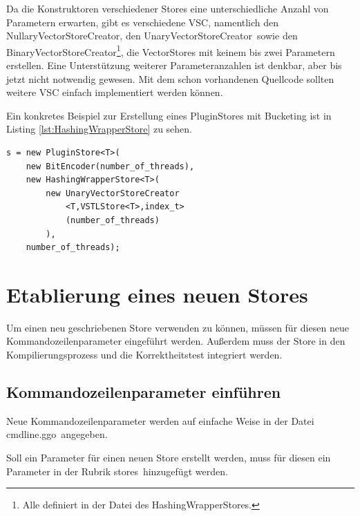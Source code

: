 \documentclass[12pt,a4paper,titlepage]{scrartcl}
\renewcommand \( {\left (}
\renewcommand \) {\right )}
\renewcommand \[ {\left [}
\renewcommand \] {\right ]}
\newcommand \Flqq {\flqq\ }
\begin{document}
Da die Konstruktoren verschiedener Stores eine unterschiedliche Anzahl von Parametern erwarten, gibt es verschiedene VSC, namentlich den \frqq NullaryVectorStoreCreator\frqq, den \frqq UnaryVectorStoreCreator\Flqq sowie den \frqq BinaryVectorStoreCreator\flqq\footnote{Alle definiert in der Datei des HashingWrapperStores.}, die VectorStores mit keinem bis zwei Parametern erstellen. Eine Unterstützung weiterer Parameteranzahlen ist denkbar, aber bis jetzt nicht notwendig gewesen. Mit dem schon vorhandenen Quellcode sollten weitere VSC einfach implementiert werden können.

Ein konkretes Beispiel zur Erstellung eines PluginStores mit Bucketing ist in Listing \ref{lst:HashingWrapperStore} zu sehen.

\begin{center}
\begin{minipage}{0.7\textwidth}
\lstset{language=C++}
\begin{lstlisting}[label=lst:HashingWrapperStore,caption={Erstellung eines PluginStores mit Bucketing. Dem HashingWrapperStore wird ein UnaryVectorStoreCreator übergeben, welcher einen VSTLStore erstellt. Das Argument des VSC-Konstruktors wird an jeden erstellten VSTL-Store weitergereicht.}]
s = new PluginStore<T>(
	new BitEncoder(number_of_threads),
	new HashingWrapperStore<T>(
		new UnaryVectorStoreCreator
			<T,VSTLStore<T>,index_t>
			(number_of_threads)
		),
	number_of_threads);
\end{lstlisting}
\end{minipage}
\end{center}


\section{Etablierung eines neuen Stores}
\label{kap:Etablierung}
Um einen neu geschriebenen Store verwenden zu können, müssen für diesen neue Kommandozeilenparameter eingeführt werden. Außerdem muss der Store in den Kompilierungsprozess und die Korrektheitstest integriert werden.

\subsection{Kommandozeilenparameter einführen}
Neue Kommandozeilenparameter werden auf einfache Weise in der Datei \frqq cmdline.ggo\Flqq angegeben.

Soll ein Parameter für einen neuen Store erstellt werden, muss für diesen ein Parameter in der Rubrik \frqq stores\Flqq hinzugefügt werden.
\end{document}
